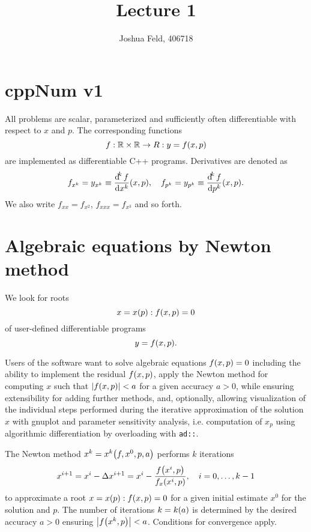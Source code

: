 \documentclass[english]{lecture}
\institute{Software and Tools for Computational Engineering}
\title{Lecture 1}
\author{Joshua Feld, 406718}
\begin{document}
    \maketitle


    \section*{cppNum v1}

    All problems are scalar, parameterized and sufficiently often differentiable with respect to \(x\) and \(p\).
    The corresponding functions
    \[
        f: \R \times \R \to R: y = f\parentheses*{x, p}
    \]
    are implemented as differentiable C++ programs.
    Derivatives are denoted as
    \[
        f_{x^k} = y_{x^k} \equiv \frac{\d^k f}{\d x^k}\parentheses*{x, p}, \quad f_{p^k} = y_{p^k} \equiv \frac{\d^k f}{\d p^k}\parentheses*{x, p}.
    \]
    We also write \(f_{xx} = f_{x^2}\), \(f_{xxx} = f_{x^3}\) and so forth.


    \section*{Algebraic equations by Newton method}

    We look for roots
    \[
        x = x\parentheses*{p}: f\parentheses*{x, p} = 0
    \]
    of user-defined differentiable programs
    \[
        y = f\parentheses*{x, p}.
    \]

    Users of the software want to solve algebraic equations \(f\parentheses*{x, p} = 0\) including the ability to implement the residual \(f\parentheses*{x, p}\), apply the Newton method for computing \(x\) such that \(\absolute*{f\parentheses*{x, p}} < a\) for a given accuracy \(a > 0\), while ensuring extensibility for adding further methods, and, optionally, allowing visualization of the individual steps performed during the iterative approximation of the solution \(x\) with gnuplot and parameter sensitivity analysis, i.e. computation of \(x_p\) using algorithmic differentiation by overloading with \texttt{ad::}.

    The Newton method \(x^k = x^k\parentheses*{f, x^0, p, a}\) performs \(k\) iterations
    \[
        x^{i + 1} = x^i - \Delta x^{i + 1} = x^i - \frac{f\parentheses*{x^i, p}}{f_x\parentheses*{x^i, p}}, \quad i = 0, \ldots, k - 1
    \]
    to approximate a root \(x = x\parentheses*{p}: f\parentheses*{x, p} = 0\) for a given initial estimate \(x^0\) for the solution and \(p\).
    The number of iterations \(k = k\parentheses*{a}\) is determined by the desired accuracy \(a > 0\) ensuring \(\absolute*{f\parentheses*{x^k, p}} < a\).
    Conditions for convergence apply.
\end{document}
